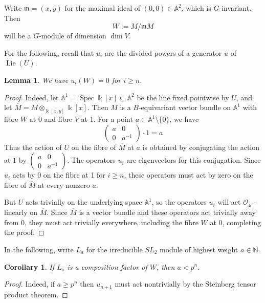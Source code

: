 \documentclass[11pt]{amsart}
\def\dim{\operatorname{dim}}
\def\N{\mathbb{N}}
\def\A{\mathbb{A}}
\def\A{\mathbb{A}}
\def\OO{\mathcal{O}}
\def\m{\mathfrak{m}}
\def\ol{\overline}
\def\Spec{\operatorname{Spec}}
\def\sub{\subseteq}
\newtheorem{cor}[thm]{Corollary}
\newtheorem{lemma}[thm]{Lemma}
\theoremstyle{definition}
\theoremstyle{remark}
\numberwithin{equation}{section}
\begin{document}
Write $\m=(x,y)$ for the maximal ideal of $(0,0)\in\A^2$, which is $G$-invariant. Then 
\[
W:=M/\m M
\]
will be a $G$-module of dimension $\dim V$.  

For the following, recall that $u_i$ are the divided powers of a generator $u$ of $\operatorname{Lie}(U)$.
\begin{lemma}
      We have $u_i(W)=0$ for $i\geq n$.
\end{lemma}

\begin{proof}
    Indeed, let $\A^1=\Spec \Bbbk[x]\sub\A^2$ be the line fixed pointwise by $U$, and let \linebreak $\ol{M}=M\otimes_{\Bbbk[x,y]}\Bbbk[x]$.  Then $M$ is a $B$-equivariant vector bundle on $\A^1$ with fibre $W$ at 0 and fibre $V$ at 1.  For a point $a\in\A^1\setminus \{0\}$, we have 
    \[
    \begin{pmatrix}
        a & 0\\0 & a^{-1}
    \end{pmatrix}\cdot 1=a
    \]
    Thus the action of $U$ on the fibre of $\ol{M}$ at $a$ is obtained by conjugating the action at $1$ by $\begin{pmatrix}
        a & 0\\0 & a^{-1}
    \end{pmatrix}$.  The operators $u_i$ are eigenvectors for this conjugation.  Since $u_i$ acts by 0 on the fibre at 1 for $i\geq n$, these operators must act by zero on the fibre of $\ol{M}$ at every nonzero $a$.  
    
    But $U$ acts trivially on the underlying space $\A^1$, so the operators $u_i$ will act $\OO_{\A^1}$-linearly on $\ol{M}$.  Since $\ol{M}$ is a vector bundle and these operators act trivially away from 0, they must act trivially everywhere, including the fibre $W$ at 0, completing the proof.
\end{proof}

In the following, write $L_a$ for the irreducible $SL_2$ module of highest weight $a\in\N$.

\begin{cor}\label{cor comp fact X}
    If $L_a$ is a composition factor of $W$, then $a<p^{n}$.
\end{cor}

\begin{proof}
    Indeed, if $a\geq p^n$ then $u_{n+1}$ must act nontrivially by the Steinberg tensor product theorem.
\end{proof}
\end{document}
